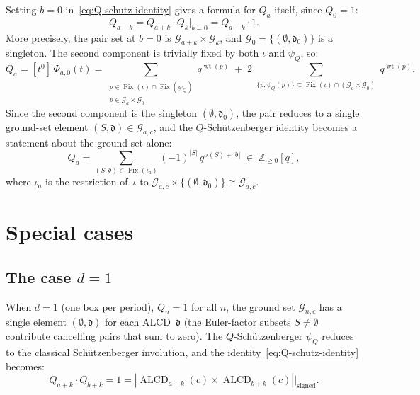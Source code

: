 \documentclass[11pt]{article}
\newcommand{\Z}{\mathbb{Z}}
\newcommand{\ALCD}{\operatorname{ALCD}}
\DeclareMathOperator{\wt}{wt}
\DeclareMathOperator{\Fix}{Fix}
\theoremstyle{plain}
\theoremstyle{definition}
\begin{document}
Setting $b = 0$ in~\eqref{eq:Q-schutz-identity} gives a
formula for $Q_a$ itself, since $Q_0 = 1$:
\begin{equation}\label{eq:b0}
  Q_{a+k}
  = Q_{a+k} \cdot Q_k \big|_{b=0}
  = Q_{a+k} \cdot 1.
\end{equation}
More precisely, the pair set at $b = 0$ is
$\mathcal{G}_{a+k} \times \mathcal{G}_{k}$, and
$\mathcal{G}_0 = \{(\emptyset, \mathfrak{d}_0)\}$ is a
singleton.  The second component is trivially fixed by both
$\iota$ and $\psi_Q$, so:
\begin{equation}\label{eq:Q-from-Phi}
  Q_a = [t^0]\, \Phi_{a,0}(t)
  = \sum_{\substack{p \in \Fix(\iota) \cap \Fix(\psi_Q)
    \\ p \in \mathcal{G}_a \times \mathcal{G}_0}}
    q^{\wt(p)}
  \;+\;
  2 \sum_{\substack{\{p, \psi_Q(p)\}
    \subseteq \Fix(\iota) \cap (\mathcal{G}_a \times
    \mathcal{G}_0)}}
    q^{\wt(p)}.
\end{equation}
Since the second component is the singleton
$(\emptyset, \mathfrak{d}_0)$, the pair reduces to a single
ground-set element $(S, \mathfrak{d}) \in \mathcal{G}_{a,c}$,
and the $Q$-Sch\"utzenberger identity becomes a statement
about the ground set alone:
\begin{equation}\label{eq:Q-ground-set-identity}
  Q_a = \sum_{(S, \mathfrak{d}) \in \Fix(\iota_a)}
    (-1)^{|S|}\, q^{\sigma(S) + |\mathfrak{d}|}
  \;\in\; \Z_{\geq 0}[q],
\end{equation}
where $\iota_a$ is the restriction of~$\iota$ to
$\mathcal{G}_{a,c} \times \{(\emptyset, \mathfrak{d}_0)\}
\cong \mathcal{G}_{a,c}$.


\section{Special cases}
\label{sec:special}

\subsection{The case $d = 1$}

When $d = 1$ (one box per period), $Q_n = 1$ for all $n$, the
ground set $\mathcal{G}_{n,c}$ has a single element
$(\emptyset, \mathfrak{d})$ for each ALCD~$\mathfrak{d}$ (the
Euler-factor subsets $S \neq \emptyset$ contribute
cancelling pairs that sum to zero).  The $Q$-Sch\"utzenberger
$\psi_Q$ reduces to the classical Sch\"utzenberger involution,
and the identity~\eqref{eq:Q-schutz-identity} becomes:
\[
  Q_{a+k} \cdot Q_{b+k} = 1
  = |\ALCD_{a+k}(c) \times \ALCD_{b+k}(c)|\big|_{\text{signed}}.
\]
\end{document}
